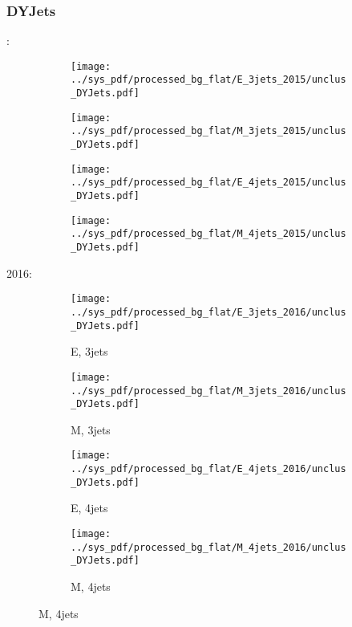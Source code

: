 \documentclass{beamer}
\begin{document}
\begin{frame}
\frametitle{DYJets}
\fontsize{5}{1}:
\begin{figure}
\centering
\begin{subfigure}[b]{0.24\textwidth}
\texttt{[image: ../sys\_pdf/processed\_bg\_flat/E\_3jets\_2015/unclus\_DYJets.pdf]}
\end{subfigure}
\begin{subfigure}[b]{0.24\textwidth}
\texttt{[image: ../sys\_pdf/processed\_bg\_flat/M\_3jets\_2015/unclus\_DYJets.pdf]}
\end{subfigure}
\begin{subfigure}[b]{0.24\textwidth}
\texttt{[image: ../sys\_pdf/processed\_bg\_flat/E\_4jets\_2015/unclus\_DYJets.pdf]}
\end{subfigure}
\begin{subfigure}[b]{0.24\textwidth}
\texttt{[image: ../sys\_pdf/processed\_bg\_flat/M\_4jets\_2015/unclus\_DYJets.pdf]}
\end{subfigure}
\end{figure}
2016:
\begin{figure}
\centering
\begin{subfigure}[b]{0.24\textwidth}
\texttt{[image: ../sys\_pdf/processed\_bg\_flat/E\_3jets\_2016/unclus\_DYJets.pdf]}
\captionsetup{font=tiny}
\caption{E, 3jets}
\end{subfigure}
\begin{subfigure}[b]{0.24\textwidth}
\texttt{[image: ../sys\_pdf/processed\_bg\_flat/M\_3jets\_2016/unclus\_DYJets.pdf]}
\captionsetup{font=tiny}
\caption{M, 3jets}
\end{subfigure}
\begin{subfigure}[b]{0.24\textwidth}
\texttt{[image: ../sys\_pdf/processed\_bg\_flat/E\_4jets\_2016/unclus\_DYJets.pdf]}
\captionsetup{font=tiny}
\caption{E, 4jets}
\end{subfigure}
\begin{subfigure}[b]{0.24\textwidth}
\texttt{[image: ../sys\_pdf/processed\_bg\_flat/M\_4jets\_2016/unclus\_DYJets.pdf]}
\captionsetup{font=tiny}
\caption{M, 4jets}
\end{subfigure}
\end{figure}
\end{frame}
\end{document}
